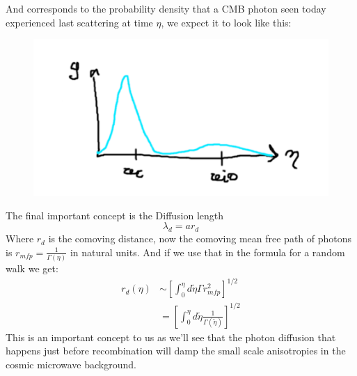 \documentclass{article}
\begin{document}
And corresponds to the probability density that a CMB photon seen today experienced last scattering at time $\eta$, we expect it to look like this:
\begin{figure}[h]
  \centering
  \includegraphics{visibility.png}
\end{figure}
The final important concept is the Diffusion length
\begin{equation}
  \lambda_d = a r_d
\end{equation}
Where $r_d$ is the comoving distance, now the comoving mean free path of photons is $r_{mfp} = \frac{1}{\Gamma(\eta)}$ in natural units. And if we use that in the formula for a random walk we get:
\begin{align}
  r_d(\eta) &\sim \left[\int_0^\eta d\tilde{\eta}\Gamma r_{mfp}^2\right]^{1/2}\\
            &=  \left[\int_0^\eta d\tilde{\eta}\frac{1}{\Gamma(\tilde{\eta})}\right]^{1/2}
\end{align}
This is an important concept to us as we'll see that the photon diffusion that happens just before recombination will damp the small scale anisotropies in the cosmic microwave background.
\end{document}
